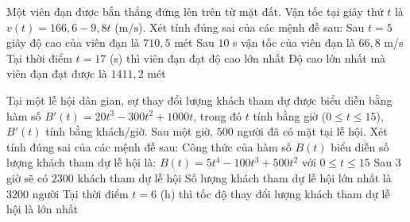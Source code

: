 \begin{ex}%
 Một viên đạn được bắn thẳng đứng lên trên từ mặt đất. Vận tốc tại giây thứ $t$ là $v(t) = 166,6 - 9,8t$ ($\text{m}/\text{s}$). Xét tính đúng sai của các mệnh đề sau:
 \choiceTF
 {\True Sau $t=5$ giây độ cao của viên đạn là $710,5$ mét}
 {Sau $10$ s vận tốc của viên đạn là $66,8$ m/s}
 {\True Tại thời điểm $t=17$ (s) thì viên đạn đạt độ cao lớn nhất}
 {Độ cao lớn nhất mà viên đạn đạt được là $1411,2$ mét}
\end{ex}
\begin{ex}%
 Tại một lễ hội dân gian, sự thay đổi lượng khách tham dự được biểu diễn bằng hàm số $B'(t)=20t^3 - 300t^2 + 1000t$, trong đó $t$ tính bằng giờ ($0 \le t \le 15$), $B'(t)$ tính bằng khách/giờ. Sau một giờ, $500$ người đã có mặt tại lễ hội. Xét tính đúng sai của các mệnh đề sau:
 \choiceTF
 {Công thức của hàm số $B(t)$ biểu diễn số lượng khách tham dự lễ hội là: $B(t)=5t^4 - 100t^3 + 500t^2$ với $0 \le t \le 15$}
 {\True Sau $3$ giờ sẽ có $2300$ khách tham dự lễ hội}
 {Số lượng khách tham dự lễ hội lớn nhất là $3200$ người}
 {Tại thời điểm $t=6$ (h) thì tốc độ thay đổi lượng khách tham dự lễ hội là lớn nhất}
\end{ex}
